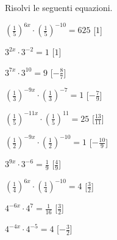\begin{esercizio}\label{ese:}
 Risolvi le seguenti equazioni.
\begin{multicols}{2}
 \begin{enumeratea}
  \item  \(\left(\frac{1}{5}\right)^{6x} \cdot \left(\frac{1}{5}\right)^{-10} = 
625\)
   \hfill [\(1\)]
  \item  \(3^{2x} \cdot 3^{-2} = 1\)
   \hfill [\(1\)]
  \item  \(3^{7x} \cdot 3^{10} = 9\)
   \hfill [\(-\frac{8}{7}\)]
  \item  \(\left(\frac{1}{3}\right)^{-9x} \cdot \left(\frac{1}{3}\right)^{-7} = 
1\)
   \hfill [\(-\frac{7}{9}\)]
  \item  \(\left(\frac{1}{5}\right)^{-11x} \cdot \left(\frac{1}{5}\right)^{11} 
= 25\)
   \hfill [\(\frac{13}{11}\)]
  \item  \(\left(\frac{1}{2}\right)^{-9x} \cdot \left(\frac{1}{2}\right)^{-10} 
= 1\)
   \hfill [\(-\frac{10}{9}\)]
  \item  \(3^{9x} \cdot 3^{-6} = \frac{1}{9}\)
   \hfill [\(\frac{4}{9}\)]
  \item  \(\left(\frac{1}{4}\right)^{6x} \cdot \left(\frac{1}{4}\right)^{-10} = 
4\)
   \hfill [\(\frac{3}{2}\)]
  \item  \(4^{-6x} \cdot 4^{7} = \frac{1}{16}\)
   \hfill [\(\frac{3}{2}\)]
  \item  \(4^{-4x} \cdot 4^{-5} = 4\)
   \hfill [\(-\frac{3}{2}\)]

\end{enumeratea}
\end{multicols}
\end{esercizio}
